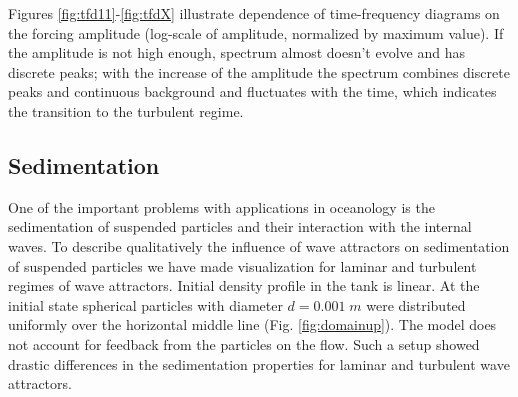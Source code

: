\documentclass[a4wide,fontsize=12pt]{article}
\begin{document}
Figures \ref{fig:tfd11}-\ref{fig:tfdX} illustrate dependence of time-frequency diagrams on the forcing amplitude 
(log-scale of amplitude, normalized by maximum value).
If the amplitude is not high enough, spectrum almost doesn't evolve and has discrete peaks; with the increase of the amplitude the spectrum combines discrete peaks and continuous background and fluctuates with the time, which indicates the transition to the turbulent regime.

\subsection{Sedimentation}

One of the important problems with applications in oceanology is the sedimentation of suspended particles and their interaction with the internal waves. To describe qualitatively the influence of wave attractors on sedimentation of suspended particles we have made visualization for laminar and turbulent regimes of wave attractors. Initial density profile in  the tank is linear.
At the initial state spherical particles with diameter $d=0.001 \; m$ were distributed uniformly over the horizontal middle line (Fig. \ref{fig:domainup}). 
The model does not account for feedback from the particles on the flow. 
Such a setup showed drastic differences in the sedimentation properties for laminar and turbulent wave attractors.
\end{document}
